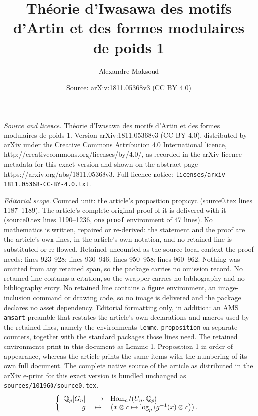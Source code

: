 \documentclass[10pt,a4paper]{amsart}
\title{Théorie d'Iwasawa des motifs d'Artin et des formes modulaires de poids 1}
\author{Alexandre Maksoud}
\date{Source: arXiv:1811.05368v3 (CC BY 4.0)}
\DeclareMathOperator{\Hom}{Hom}
\newcommand\bQ{\mathbb{Q}}
\newcommand{\ob}[1]{\mkern 1.5mu\overline{\mkern-1.5mu#1\mkern-1.5mu}\mkern 1.5mu}
\begin{document}
\maketitle

\noindent\emph{Source and licence.} Théorie d'Iwasawa des motifs d'Artin et des formes modulaires de poids 1. Version arXiv:1811.05368v3 (CC BY 4.0), distributed by arXiv under the Creative Commons Attribution 4.0 International licence, http://creativecommons.org/licenses/by/4.0/, as recorded in the arXiv licence metadata for this exact version and shown on the abstract page https://arxiv.org/abs/1811.05368v3. Full licence notice: \texttt{licenses/arxiv-1811.05368-CC-BY-4.0.txt}.\par\smallskip

\noindent\textit{Editorial scope.} Counted unit: the article's proposition prop:cyc (source0.tex lines 1187--1189). The article's complete original proof of it is delivered with it (source0.tex lines 1190--1236, one \texttt{proof} environment of 47 lines). No mathematics is written, repaired or re-derived: the statement and the proof are the article's own lines, in the article's own notation, and no retained line is substituted or re-flowed.  Retained uncounted as the source-local context the proof needs: lines 923--928; lines 930--946; lines 950--958; lines 960--962.  Nothing was omitted from any retained span, so the package carries no omission record.  No retained line contains a citation, so the wrapper carries no bibliography and no bibliography entry.  No retained line contains a figure environment, an image-inclusion command or drawing code, so no image is delivered and the package declares no asset dependency.  Editorial formatting only, in addition: an AMS \texttt{amsart} preamble that restates the article's own declarations and macros used by the retained lines, namely the environments \texttt{lemme}, \texttt{proposition} on separate counters, together with the standard packages those lines need.  The retained environments print in this document as Lemme 1, Proposition 1 in order of appearance, whereas the article prints the same items with the numbering of its own full document.  The complete native source of the article as distributed in the arXiv e-print for this exact version is bundled unchanged as \texttt{sources/101960/source0.tex}.
\begin{equation}\label{isomQbar}
\left\{ \begin{array}{rcl}
\ob{\bQ}_p[G_n] & \longrightarrow & \Hom_\textrm{ct}(U_n,\ob{\bQ}_p) \\
g          & \mapsto         & \left( x\otimes c \mapsto \log_p\left(g^{-1}(x)\otimes c \right) \right).
\end{array} \right.
\end{equation}
\end{document}
